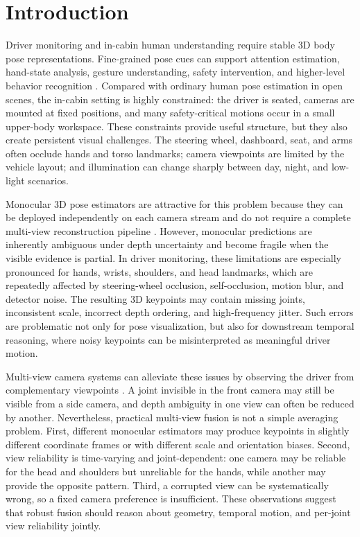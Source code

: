 \documentclass[runningheads]{llncs}
\begin{document}
\section{Introduction}

Driver monitoring and in-cabin human understanding require stable 3D body pose representations. Fine-grained pose cues can support attention estimation, hand-state analysis, gesture understanding, safety intervention, and higher-level behavior recognition \cite{abouelnaga2017real,zhang2018driver,gorelik2026multiview}. Compared with ordinary human pose estimation in open scenes, the in-cabin setting is highly constrained: the driver is seated, cameras are mounted at fixed positions, and many safety-critical motions occur in a small upper-body workspace. These constraints provide useful structure, but they also create persistent visual challenges. The steering wheel, dashboard, seat, and arms often occlude hands and torso landmarks; camera viewpoints are limited by the vehicle layout; and illumination can change sharply between day, night, and low-light scenarios.

Monocular 3D pose estimators are attractive for this problem because they can be deployed independently on each camera stream and do not require a complete multi-view reconstruction pipeline \cite{toshev2014deeppose,martinez2017simple,mehta2017vnect}. However, monocular predictions are inherently ambiguous under depth uncertainty and become fragile when the visible evidence is partial. In driver monitoring, these limitations are especially pronounced for hands, wrists, shoulders, and head landmarks, which are repeatedly affected by steering-wheel occlusion, self-occlusion, motion blur, and detector noise. The resulting 3D keypoints may contain missing joints, inconsistent scale, incorrect depth ordering, and high-frequency jitter. Such errors are problematic not only for pose visualization, but also for downstream temporal reasoning, where noisy keypoints can be misinterpreted as meaningful driver motion.

Multi-view camera systems can alleviate these issues by observing the driver from complementary viewpoints \cite{iskakov2019learnable,qiu2019cross,tu2020voxelpose}. A joint invisible in the front camera may still be visible from a side camera, and depth ambiguity in one view can often be reduced by another. Nevertheless, practical multi-view fusion is not a simple averaging problem. First, different monocular estimators may produce keypoints in slightly different coordinate frames or with different scale and orientation biases. Second, view reliability is time-varying and joint-dependent: one camera may be reliable for the head and shoulders but unreliable for the hands, while another may provide the opposite pattern. Third, a corrupted view can be systematically wrong, so a fixed camera preference is insufficient. These observations suggest that robust fusion should reason about geometry, temporal motion, and per-joint view reliability jointly.
\end{document}
